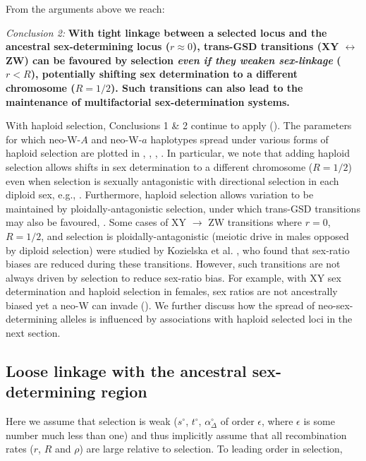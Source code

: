 \documentclass[10pt,letterpaper]{article}
\begin{document}
From the arguments above we reach:
\vspace{0.5cm}

\noindent\textit{Conclusion 2:}
\textbf{
With tight linkage between a selected locus and the ancestral sex-determining locus ($r\approx0$), trans-GSD transitions (XY $\leftrightarrow$ ZW) can be favoured by selection \textit{even if they weaken sex-linkage} ($r<R$), potentially shifting sex determination to a different chromosome ($R=1/2$). 
Such transitions can also lead to the maintenance of multifactorial sex-determination systems.
}
\vspace{0.5cm} 

\noindent
With haploid selection, Conclusions 1 \& 2 continue to apply (). 
The parameters for which neo-W-$A$ and neo-W-$a$ haplotypes spread under various forms of haploid selection are plotted in , , , .
In particular, we note that adding haploid selection allows shifts in sex determination to a different chromosome ($R=1/2$) even when selection is sexually antagonistic with directional selection in each diploid sex, e.g., .  
Furthermore, haploid selection allows variation to be maintained by ploidally-antagonistic selection, under which trans-GSD transitions may also be favoured, .
Some cases of XY $\rightarrow$ ZW transitions where $r=0$, $R=1/2$, and selection is ploidally-antagonistic (meiotic drive in males opposed by diploid selection) were studied by Kozielska et al. \cite{Kozielska:2010vm}, who found that sex-ratio biases are reduced during these transitions. 
However, such transitions are not always driven by selection to reduce sex-ratio bias. 
For example, with XY sex determination and haploid selection in females, sex ratios are not ancestrally biased yet a neo-W can invade (). 
We further discuss how the spread of neo-sex-determining alleles is influenced by associations with haploid selected loci in the next section. 

\subsection*{Loose linkage with the ancestral sex-determining region}

Here we assume that selection is weak ($s^\circ$, $t^\circ$, $\alpha_{\Delta}^\circ$ of order $\epsilon$, where $\epsilon$ is some number much less than one) and thus implicitly assume that all recombination rates ($r$, $R$ and $\rho$) are large relative to selection.
To leading order in selection,
\end{document}

